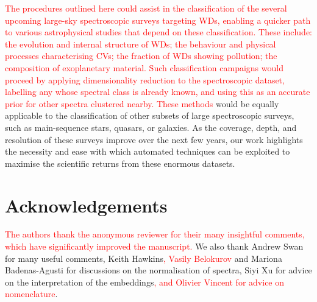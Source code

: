 \documentclass[fleqn,usenatbib]{mnras}
\newcommand{\red}[1]{\textcolor{red}{#1}}
\begin{document}
\red{
The procedures outlined here could assist in the classification of the several upcoming large-sky spectroscopic surveys targeting WDs, enabling a quicker path to various astrophysical studies that depend on these classification.
These include: the evolution and internal structure of WDs; the behaviour and physical processes characterising CVs; the fraction of WDs showing pollution; the composition of exoplanetary material.
Such classification campaigns would proceed by applying dimensionality reduction to the spectroscopic dataset, labelling any whose spectral class is already known, and using this as an accurate prior for other spectra clustered nearby.
These methods} would be equally applicable to the classification of other subsets of large spectroscopic surveys, such as main-sequence stars, quasars, or galaxies.
As the coverage, depth, and resolution of these surveys improve over the next few years, our work highlights the necessity and ease with which automated techniques can be exploited to maximise the scientific returns from these enormous datasets.

\section*{Acknowledgements}

\red{The authors thank the anonymous reviewer for their many insightful comments, which have significantly improved the manuscript.}
We also thank Andrew Swan for many useful comments, Keith Hawkins\red{, Vasily Belokurov} and Mariona Badenas-Agusti for discussions on the normalisation of spectra, Siyi Xu for advice on the interpretation of the embeddings\red{, and Olivier Vincent for advice on nomenclature}.
\end{document}
